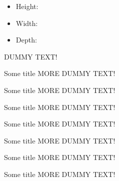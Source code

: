 \documentclass[aspectratio=169]{beamer}
\begin{document}
\begin{frame}
   \begin{itemize}
      \item Height:
      \item Width: 
      \item Depth: 
   \end{itemize}
\end{frame}

\begin{frame}[ecoslide]
DUMMY TEXT!
\end{frame}

\begin{frame}{Some title}
MORE DUMMY TEXT!
\end{frame}

\begin{frame}[standardslide]{Some title}
MORE DUMMY TEXT!
\end{frame}

\begin{frame}{Some title}
MORE DUMMY TEXT!
\end{frame}

\begin{frame}[plain]{Some title}
MORE DUMMY TEXT!
\end{frame}

\begin{frame}{Some title}
MORE DUMMY TEXT!
\end{frame}

\begin{frame}{Some title}
MORE DUMMY TEXT!
\end{frame}

\begin{frame}{Some title}
MORE DUMMY TEXT!
\end{frame}
\end{document}
